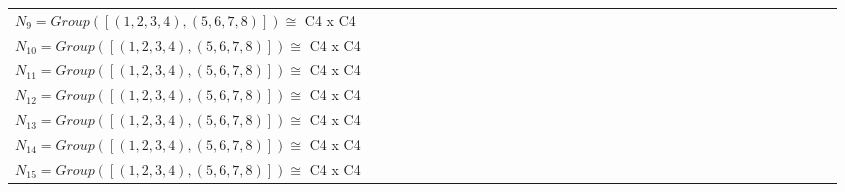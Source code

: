 \documentclass[varwidth=\maxdimen,border=10]{standalone}
\begin{document}
\begin{tabular}{@{}l@{}l@{}l@{}l@{}l@{}l@{}l@{}l@{}l@{}l@{}l@{}l@{}l@{}l@{}l@{}l@{}l@{}l@{}l@{}l@{}l@{}l@{}l@{}l@{}l@{}l@{}l@{}l@{}l@{}l@{}l@{}l@{}l@{}l@{}}
$N_{9} = Group( [ (1,2,3,4), (5,6,7,8) ] )\cong$ C4 x C4\ \\
$N_{10} = Group( [ (1,2,3,4), (5,6,7,8) ] )\cong$ C4 x C4\ \\
$N_{11} = Group( [ (1,2,3,4), (5,6,7,8) ] )\cong$ C4 x C4\ \\
$N_{12} = Group( [ (1,2,3,4), (5,6,7,8) ] )\cong$ C4 x C4\ \\
$N_{13} = Group( [ (1,2,3,4), (5,6,7,8) ] )\cong$ C4 x C4\ \\
$N_{14} = Group( [ (1,2,3,4), (5,6,7,8) ] )\cong$ C4 x C4\ \\
$N_{15} = Group( [ (1,2,3,4), (5,6,7,8) ] )\cong$ C4 x C4\end{tabular}
\end{document}
